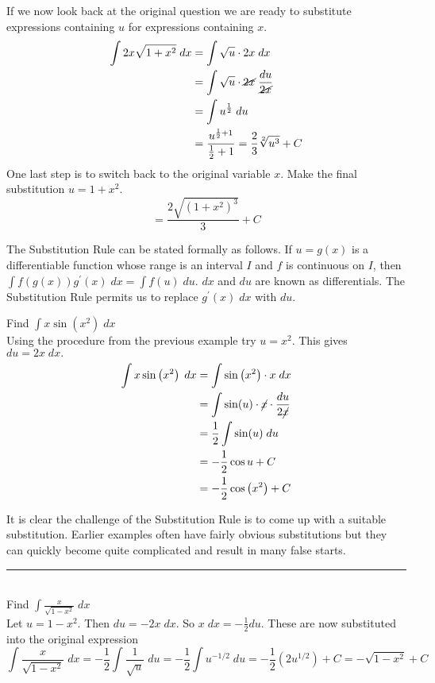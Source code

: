 If we now look back at the original question we are ready to substitute expressions containing $u$ for expressions containing $x$.
\begin{align*}
\int 2 x \sqrt{1 +x^{2}}\; d x &  = \int \sqrt{u} \cdot 2 x\; d x \\
 &  = \int \sqrt{u}\cdot \cancel{2x}\; \frac{du}{\cancel{2x}}\\
 &  = \int u^{\frac{1}{2}}\; d u \\
 &  = \frac{u^{\frac{1}{2} +1}}{\frac{1}{2} +1}= \frac{2}{3}\sqrt[2]{u^3}+C
 \end{align*}
 One last step is to switch back to the original variable $x$. Make the final substitution $u=1+x^2$.
 \[ = \frac{2 \sqrt{\left (1 +x^{2}\right )^{3}}}{3} +C \]
 
The Substitution Rule can be stated formally as follows. If $u =g (x)$ is a differentiable function whose range is an interval $I$ and $f$ is continuous on $I$, then $\int f \left (g \left (x\right )\right ) g^{ \prime } \left (x\right )\; d x =\int f \left (u\right )\; d u$. $d x$ and $d u$ are known as differentials. The Substitution Rule permits us to replace $g^{ \prime } \left (x\right )\; d x$ with $d u$. 

\example Find $\int x \sin  \left (x^{2}\right )\; dx$\medskip\\
\solution Using the procedure from the previous example try $u =x^{2}$. This gives $d u =2 x\; d x\text{.}$
\begin{align*}\int x \sin  \left (x^{2}\right )\; d x &  = \int \sin  \left (x^{2}\right ) \cdot x\; d x \\
 &  = \int \sin(u) \cdot \cancel{x}\cdot\frac{du}{2\cancel{x}} \\
 &  = \frac{1}{2} \int \sin(u)\; d u \\
 &  =  -\frac{1}{2} \cos  u +C \\
 &  =  -\frac{1}{2} \cos  \left (x^{2}\right ) +C\end{align*}

It is clear the challenge of the Substitution Rule is to come up with a suitable substitution. Earlier examples often have fairly obvious substitutions but they can quickly become quite complicated and result in many false starts. \\
\rule{6.8cm}{0.5pt}\\
\example Find $\int \frac{x}{\sqrt{1 -x^{2}}}\; d x$\medskip\\
\solution Let $u =1 -x^{2}$. Then $d u = -2 x\; d x$. So $x\; d x = -\frac{1}{2} d u$. These are now substituted into the original expression
$$\int \frac{x}{\sqrt{1 -x^{2}}}\; d x = -\frac{1}{2} \int \frac{1}{\sqrt{u}}\; d u = -\frac{1}{2} \int u^{ -1/2}\; d u = -\frac{1}{2} \left (2 u^{1/2}\right ) +C = -\sqrt{1 -x^{2}} +C$$

